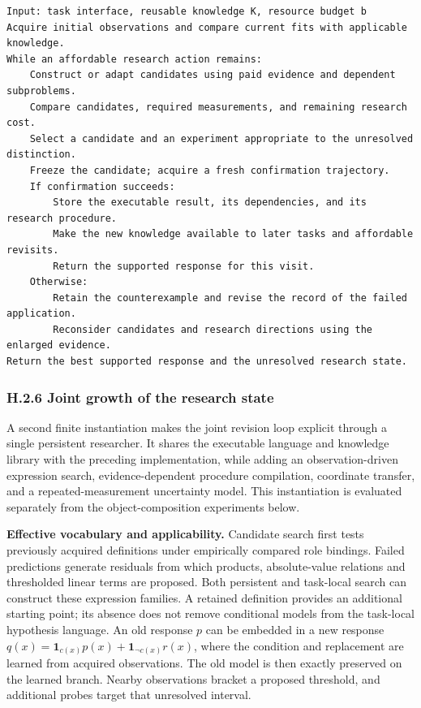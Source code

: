 \documentclass[twoside,11pt]{article}
\begin{document}
\begin{Verbatim}[fontsize=\small,breaklines=true,breakanywhere=true]
Input: task interface, reusable knowledge K, resource budget b
Acquire initial observations and compare current fits with applicable knowledge.
While an affordable research action remains:
    Construct or adapt candidates using paid evidence and dependent subproblems.
    Compare candidates, required measurements, and remaining research cost.
    Select a candidate and an experiment appropriate to the unresolved distinction.
    Freeze the candidate; acquire a fresh confirmation trajectory.
    If confirmation succeeds:
        Store the executable result, its dependencies, and its research procedure.
        Make the new knowledge available to later tasks and affordable revisits.
        Return the supported response for this visit.
    Otherwise:
        Retain the counterexample and revise the record of the failed application.
        Reconsider candidates and research directions using the enlarged evidence.
Return the best supported response and the unresolved research state.
\end{Verbatim}

\subsubsection*{H.2.6 Joint growth of the research state}

A second finite instantiation makes the joint revision loop explicit through a
single persistent researcher. It shares the executable language and knowledge
library with the preceding implementation, while adding an observation-driven
expression search, evidence-dependent procedure compilation, coordinate transfer,
and a repeated-measurement uncertainty model. This instantiation is evaluated
separately from the object-composition experiments below.


\textbf{Effective vocabulary and applicability.} Candidate search first tests
previously acquired definitions under empirically compared role bindings. Failed
predictions generate residuals from which products, absolute-value relations and
thresholded linear terms are proposed. Both persistent and task-local search can
construct these expression families. A retained definition provides an additional
starting point; its absence does not remove conditional models from the
task-local hypothesis language. An old response \(p\) can be embedded in a new
response \(q(x)=\mathbf{1}_{c(x)}p(x)+\mathbf{1}_{\neg c(x)}r(x)\), where the
condition and replacement are learned from acquired observations. The old model
is then exactly preserved on the learned branch. Nearby observations bracket a
proposed threshold, and additional probes target that unresolved interval.
\end{document}
